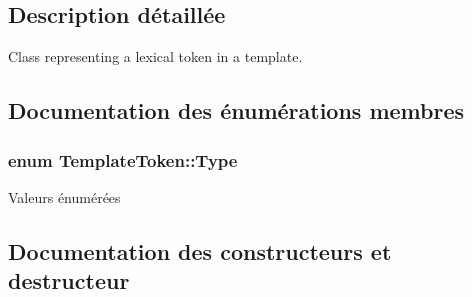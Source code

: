 \subsection{Description détaillée}
Class representing a lexical token in a template. 

\subsection{Documentation des énumérations membres}
\hypertarget{class_template_token_a45cf31d317b7b01b08e7d0b471284e77}{}
\subsubsection[{Type}]{\setlength{\rightskip}{0pt plus 5cm}enum {\bf Template\+Token\+::\+Type}}\label{class_template_token_a45cf31d317b7b01b08e7d0b471284e77}
\begin{Desc}
\item[Valeurs énumérées]\par
\begin{description}
\item[{\em 
\hypertarget{class_template_token_a45cf31d317b7b01b08e7d0b471284e77a751b09b335072516710adf86afee4fba}{}Text\label{class_template_token_a45cf31d317b7b01b08e7d0b471284e77a751b09b335072516710adf86afee4fba}
}]\item[{\em 
\hypertarget{class_template_token_a45cf31d317b7b01b08e7d0b471284e77a311bd7bdbe5632cb06a97793ac88b1c7}{}Variable\label{class_template_token_a45cf31d317b7b01b08e7d0b471284e77a311bd7bdbe5632cb06a97793ac88b1c7}
}]\item[{\em 
\hypertarget{class_template_token_a45cf31d317b7b01b08e7d0b471284e77a3d3969430e128ce00118a708306518cb}{}Block\label{class_template_token_a45cf31d317b7b01b08e7d0b471284e77a3d3969430e128ce00118a708306518cb}
}]\end{description}
\end{Desc}


\subsection{Documentation des constructeurs et destructeur}
\hypertarget{class_template_token_a45e8323438c1c810948f34f7033aafdf}{}
